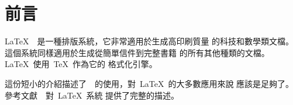 

\chapter{前言}

\LaTeX{}~\cite{manual}~是一種排版系統，它非常適用於生成高印刷質量
的科技和數學類文檔。這個系統同樣適用於生成從簡單信件到完整書籍
的所有其他種類的文檔。\LaTeX~使用~\TeX{}\cite{texbook}~作為它的
格式化引擎。%

這份短小的介紹描述了~\LaTeXe{}~的使用，對~\LaTeX{}~的大多數應用來說
應該是足夠了。參考文獻~\cite{manual,companion}~對~\LaTeX{}~系統
提供了完整的描述。%

